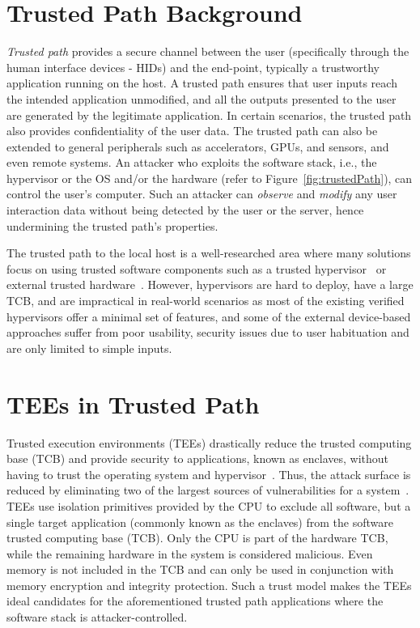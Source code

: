 \section{Trusted Path Background}

\emph{Trusted path} provides a secure channel between the user (specifically through the human interface devices - HIDs) and the end-point, typically a trustworthy application running on the host. A trusted path ensures that user inputs reach the intended application unmodified, and all the outputs presented to the user are generated by the legitimate application. In certain scenarios, the trusted path also provides confidentiality of the user data. The trusted path can also be extended to general peripherals such as accelerators, GPUs, and sensors, and even remote systems. An attacker who exploits the software stack, i.e., the hypervisor or the OS and/or the hardware (refer to Figure~\ref{fig:trustedPath}), can control the user's computer. Such an attacker can \emph{observe} and \emph{modify} any user interaction data without being detected by the user or the server, hence undermining the trusted path's properties. 

The trusted path to the local host is a well-researched area where many solutions focus on using trusted software components such as a trusted hypervisor~\cite{zhou2012building} or external trusted hardware~\cite{filyanov2011uni,weigold2011secure,McCPerRei2006,mannan2007using,Fidelius}. However, hypervisors are hard to deploy, have a large TCB, and are impractical in real-world scenarios as most of the existing verified hypervisors offer a minimal set of features, and some of the external device-based approaches suffer from poor usability, security issues due to user habituation and are only limited to simple inputs.


\section{TEEs in Trusted Path}

Trusted execution environments (TEEs) drastically reduce the trusted computing base (TCB) and provide security to applications, known as enclaves, without having to trust the operating system and hypervisor~\cite{costan2016intel,winter2008trusted,costan2016sanctum}. Thus, the attack surface is reduced by eliminating two of the largest sources of vulnerabilities for a system~\cite{checkoway2013iago,suzaki2011memory}. TEEs use isolation primitives provided by the CPU to exclude all software, but a single target application (commonly known as the enclaves) from the software trusted computing base (TCB). Only the CPU is part of the hardware TCB, while the remaining hardware in the system is considered malicious. Even memory is not included in the TCB and can only be used in conjunction with memory encryption and integrity protection. Such a trust model makes the TEEs ideal candidates for the aforementioned trusted path applications where the software stack is attacker-controlled. 


